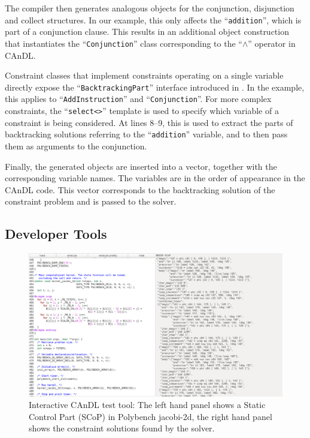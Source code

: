     The compiler then generates analogous objects for the conjunction,
    disjunction and collect structures.
    In our example, this only affects the ``\texttt{addition}'', which is part
    of a conjunction clause.
    This results in an additional object construction that instantiates the
    ``\texttt{Conjunction}'' class corresponding to the ``$\land$'' operator
    in CAnDL.

    Constraint classes that implement constraints operating on a single
    variable directly expose the ``\texttt{BacktrackingPart}'' interface
    introduced in .
    In the example, this applies to ``\texttt{AddInstruction}'' and
    ``\texttt{Conjunction}''.
    For more complex constraints, the ``\texttt{select<>}'' template is used to
    specify which variable of a constraint is being considered.
    At lines 8--9, this is used to extract the parts of backtracking solutions
    referring to the ``\texttt{addition}'' variable, and to then pass them as
    arguments to the conjunction.

    Finally, the generated objects are inserted into a vector, together with the
    corresponding variable names.
    The variables are in the order of appearance in the CAnDL code.
    This vector corresponds to the backtracking solution of the constraint
    problem and is passed to the solver.

\subsection{Developer Tools}

\begin{figure}[t]
\centering
\includegraphics[width=\textwidth]{figures/visual_gui2.png}
\caption{Interactive CAnDL test tool: The left hand panel shows a Static Control
        Part (SCoP) in Polybench jacobi-2d, the right hand panel shows the
        constraint solutions found by the solver.}
\label{fig:gui}
\end{figure}

